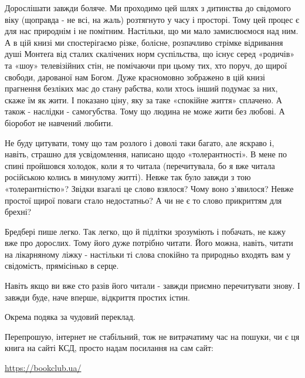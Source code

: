 Дорослішати завжди боляче. Ми проходимо цей шлях з дитинства до свідомого віку
(щоправда - не всі, на жаль) розтягнуто у часу і просторі. Тому цей процес є
для нас природнім і не помітним. Настільки, що ми мало замислюємося над ним. А
в цій книзі ми спостерігаємо різке, болісне, розпачливо стрімке відривання душі
Монтеґа від сталих скалічених норм суспільства, що існує серед «родичів» та
«шоу» телевізійних стін, не помічаючи при цьому тих, хто поруч, до щирої
свободи, дарованої нам Богом. Дуже красномовно зображено в цій книзі прагнення
безліких мас до стану рабства, коли хтось інший подумає за них, скаже їм як
жити. І показано ціну, яку за таке «спокійне життя» сплачено. А також -
наслідки - самогубства. Тому що людина не може жити без любові. А біоробот не
навчений любити.

Не буду цитувати, тому що там розлого і доволі таки багато, але яскраво і,
навіть, страшно для усвідомлення, написано щодо «толерантності». В мене по
спині пройшовся холодок, коли я то читала (перечитувала, бо я вже читала
російською колись в минулому житті). Невже так було завжди з тою
«толерантністю»? Звідки взагалі це слово взялося? Чому воно з’явилося? Невже
простої щирої поваги стало недостатньо? А чи не є то слово прикриттям для
брехні?

Бредбері пише легко. Так легко, що й підлітки зрозуміють і побачать, не кажу
вже про дорослих. Тому його дуже потрібно читати. Його можна, навіть, читати на
лікарняному ліжку - настільки ті слова спокійно та природньо входять вам у
свідомість, прямісінько в серце.

Навіть якщо ви вже сто разів його читали - завжди приємно перечитувати знову. І
завжди буде, наче вперше, відкриття простих істин.

Окрема подяка за чудовий переклад.

Перепрошую, інтернет не стабільний, тож не витрачатиму час на пошуки, чи є ця
книга на сайті КСД, просто надам посилання на сам сайт:

\url{https://bookclub.ua/}
